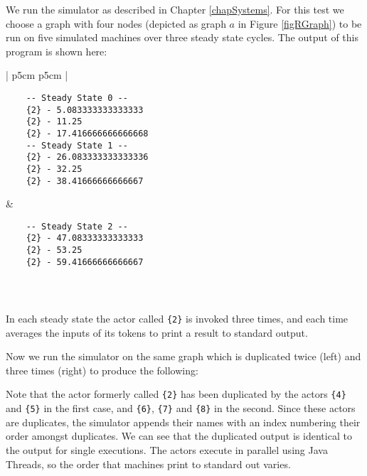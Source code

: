 We run the simulator as described in Chapter \ref{chapSystems}.
For this test we choose a graph with four nodes (depicted as graph $a$ in Figure \ref{figRGraph}) to be run on five simulated machines over three steady state cycles.
The output of this program is shown here:

\begin{center}
\begin{tabular}{ | p{5cm} p{5cm} | }
	\hline
	\begin{verbatim}
	-- Steady State 0 --
	{2} - 5.083333333333333
	{2} - 11.25
	{2} - 17.416666666666668
	-- Steady State 1 --
	{2} - 26.083333333333336
	{2} - 32.25
	{2} - 38.41666666666667
	\end{verbatim}
	&
	\begin{verbatim}
	-- Steady State 2 --
	{2} - 47.08333333333333
	{2} - 53.25
	{2} - 59.41666666666667
	\end{verbatim}
	\\ \hline
\end{tabular}
\end{center}

\begin{center}
	\begin{minipage}{0.8\linewidth}
	\begin{verbatim}
	\end{verbatim}
	\end{minipage}
\end{center}

\noindent In each steady state the actor called \verb={2}= is invoked three times, and each time averages the inputs of its tokens to print a result to standard output.

Now we run the simulator on the same graph which is duplicated twice (left) and three times (right) to produce the following:

\noindent Note that the actor formerly called \verb={2}= has been duplicated by the actors \verb={4}= and \verb={5}= in the first case, and \verb={6}=, \verb={7}= and \verb={8}= in the second.
Since these actors are duplicates, the simulator appends their names with an index numbering their order amongst duplicates.
We can see that the duplicated output is identical to the output for single executions.
The actors execute in parallel using Java Threads, so the order that machines print to standard out varies.

